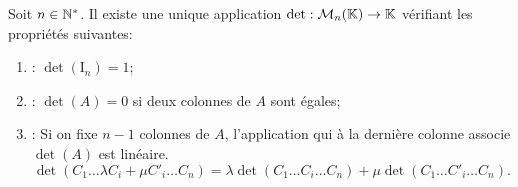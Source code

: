 \documentclass{book}
\begin{document}
\begin{Theoreme}
Soit $n\in  \mathbb{N}^*$.
Il existe une unique application $\mathop{\mathrm{det}}\nolimits: \mathcal{M}_{n}(\mathbb{K})\to\mathbb{K}$ vérifiant les propriétés suivantes:
\begin{enumerate}
\item {} : $\det(\mathrm{I}_n) = 1$;
\item
   : $\det(A) = 0$ si deux colonnes de $A$ sont égales;
\item {} :
  Si on fixe $n-1$ colonnes de $A$, l'application qui à la dernière colonne associe $\det(A)$ est linéaire.
  $$\det(C_1 \dots  \lambda C_i+ \mu C'_i  \dots C_n) = \lambda \det(C_1 \dots C_i \dots C_n) + \mu  \det(C_1 \dots C'_i \dots C_n).$$
\end{enumerate}
\end{Theoreme}
\begin{Demonstration}
\end{Demonstration}
\end{document}
